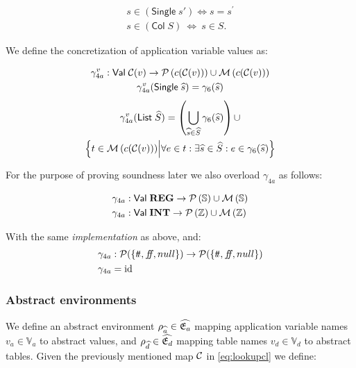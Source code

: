 \begin{align}
    s \in (\mathsf{Single} \; s') \iff s = s^\prime \\
    s \in (\mathsf{Col} \; S) \ \iff \ s \in S.
\end{align}


We define the concretization of application variable values as:


\begin{gather}
    \gamma^v_{4a} : \mathsf{Val} \; \mathcal{C}(v) \rightarrow \mathcal{P}\left(c(\mathcal{C}(v))\right) \cup \mathcal{M}\left(c(\mathcal{C}(v))\right) \\
    \gamma^v_{4a}(\mathsf{Single} \; \widehat{s}) = \gamma_6(\widehat{s})
\end{gather}
\begin{multline}
    \gamma^v_{4a}(\mathsf{List} \; \widehat{S}) = \left( \bigcup_{\widehat{s} \in \widehat{S}} \gamma_6(\widehat{s}) \right) \cup \\
    \left\{ t \in \mathcal{M}\left(c(\mathcal{C}(v))\right)\middle| \forall e \in t : \exists \widehat{s} \in \widehat{S} : e \in \gamma_6(\widehat{s}) \right\}
\end{multline}


For the purpose of proving soundness later we also overload $\gamma_{4a}$ as follows:


\begin{align}
    \gamma_{4a} &: \mathsf{Val} \; \mathbf{REG} \rightarrow \mathcal{P}\left(\mathbb{S}\right) \cup \mathcal{M}\left(\mathbb{S}\right) \\
    \gamma_{4a} &: \mathsf{Val} \; \mathbf{INT} \rightarrow \mathcal{P}\left(\mathbb{Z}\right) \cup \mathcal{M}\left(\mathbb{Z}\right)
\end{align}

With the same \emph{implementation} as above, and:
\begin{align}
    \gamma_{4a} &: \mathcal{P}(\{t\!t, f\!\!f, null\}) \rightarrow \mathcal{P}(\{t\!t, f\!\!f, null\}) \\
    \gamma_{4a} &= \mathrm{id}
\end{align}



\subsubsection{Abstract environments}\label{subsubsec:absenv}
We define an abstract environment $\rho_{\widehat{a}} \in \widehat{\mathfrak{E}_a}$ mapping application variable names $v_a \in \mathbb{V}_a$ to abstract values, and $\rho_{\widehat{d}} \in \widehat{\mathfrak{E}_d}$ mapping table names $v_d \in \mathbb{V}_d$ to abstract tables.
Given the previously mentioned map $\mathcal{C}$ in \autoref{eq:lookupcl} we define:


